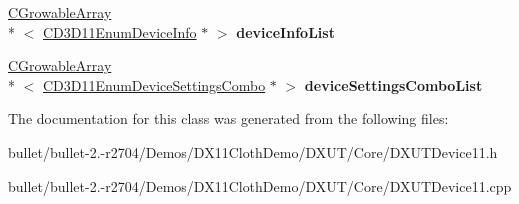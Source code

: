 \begin{DoxyCompactItemize}
\item 
\hypertarget{class_c_d3_d11_enum_adapter_info_aaa3e980991646b6502238381872f4672}{\hyperlink{class_c_growable_array}{C\+Growable\+Array}\\*
$<$ \hyperlink{class_c_d3_d11_enum_device_info}{C\+D3\+D11\+Enum\+Device\+Info} $\ast$ $>$ {\bfseries device\+Info\+List}}\label{class_c_d3_d11_enum_adapter_info_aaa3e980991646b6502238381872f4672}

\item 
\hypertarget{class_c_d3_d11_enum_adapter_info_a4a203809337f828b195cc6ab6cf56489}{\hyperlink{class_c_growable_array}{C\+Growable\+Array}\\*
$<$ \hyperlink{struct_c_d3_d11_enum_device_settings_combo}{C\+D3\+D11\+Enum\+Device\+Settings\+Combo} $\ast$ $>$ {\bfseries device\+Settings\+Combo\+List}}\label{class_c_d3_d11_enum_adapter_info_a4a203809337f828b195cc6ab6cf56489}

\end{DoxyCompactItemize}


The documentation for this class was generated from the following files\+:\begin{DoxyCompactItemize}
\item 
bullet/bullet-\/2.-\/r2704/\+Demos/\+D\+X11\+Cloth\+Demo/\+D\+X\+U\+T/\+Core/D\+X\+U\+T\+Device11.\+h\item 
bullet/bullet-\/2.-\/r2704/\+Demos/\+D\+X11\+Cloth\+Demo/\+D\+X\+U\+T/\+Core/D\+X\+U\+T\+Device11.\+cpp\end{DoxyCompactItemize}
